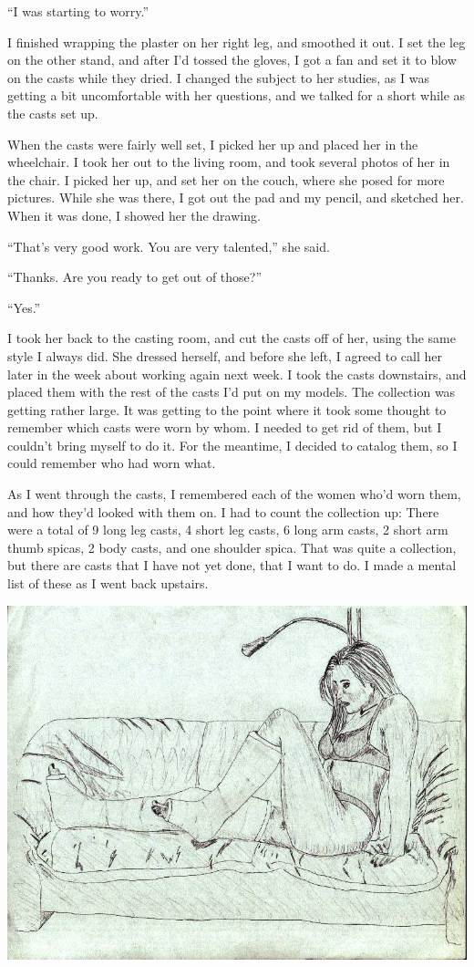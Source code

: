``I was starting to worry.''

I finished wrapping the plaster on her right leg, and smoothed it out. I set the leg on
the other stand, and after I'd tossed the gloves, I got a fan and set it to blow on the casts
while they dried. I changed the subject to her studies, as I was getting a bit uncomfortable
with her questions, and we talked for a short while as the casts set up.

When the casts were fairly well set, I picked her up and placed her in the wheelchair. I
took her out to the living room, and took several photos of her in the chair. I picked her up,
and set her on the couch, where she posed for more pictures. While she was there, I got out the
pad and my pencil, and sketched her. When it was done, I showed her the drawing.


``That's very good work. You are very talented,'' she said.

``Thanks. Are you ready to get out of those?''

``Yes.''

I took her back to the casting room, and cut the casts off of her, using the same style I
always did. She dressed herself, and before she left, I agreed to call her later in the week
about working again next week. I took the casts downstairs, and placed them with the rest of the
casts I'd put on my models. The collection was getting rather large. It was getting to the point
where it took some thought to remember which casts were worn by whom. I needed to get rid of
them, but I couldn't bring myself to do it. For the meantime, I decided to catalog them, so I
could remember who had worn what.

As I went through the casts, I remembered each of the women who'd worn them, and how
they'd looked with them on. I had to count the collection up: There were a total of 9 long leg
casts, 4 short leg casts, 6 long arm casts, 2 short arm thumb spicas, 2 body casts, and one
shoulder spica. That was quite a collection, but there are casts that I have not yet done, that
I want to do. I made a mental list of these as I went back upstairs.

\begin{center}
\includegraphics{images/kicks25.jpg}
\end{center}
